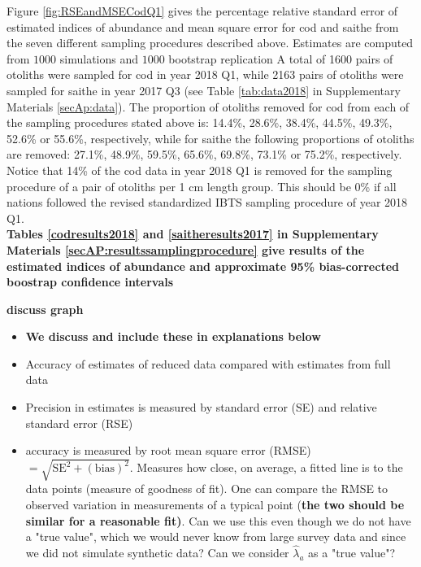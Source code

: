 \documentclass[a4paper 12pt]{article}
\numberwithin{equation}{section}
\begin{document}
{Figure \ref{fig:RSEandMSECodQ1} gives the percentage relative standard error of estimated indices of abundance and mean square error for cod and saithe from the seven different sampling procedures described above. Estimates are computed from $1000$ simulations and $1000$ bootstrap replication A total of 1600 pairs of otoliths were sampled for cod in year 2018 Q1, while 2163 pairs of otoliths were sampled for saithe in year 2017 Q3 (see Table \ref{tab:data2018} in Supplementary Materials \ref{secAp:data}). The proportion of otoliths removed for cod from each of the sampling  procedures stated above is: 14.4\%, 28.6\%, 38.4\%, 44.5\%, 49.3\%, 52.6\% or 55.6\%, respectively, while for saithe the following proportions of otoliths are removed: 27.1\%, 48.9\%, 59.5\%, 65.6\%, 69.8\%, 73.1\% or 75.2\%, respectively. Notice that 14\% of the cod data in year 2018 Q1 is removed for the sampling procedure of a pair of otoliths per 1 cm length group. This should be 0\% if all nations followed the revised standardized IBTS sampling procedure of year 2018 Q1. \\

{\bf Tables \ref{codresults2018} and \ref{saitheresults2017} in Supplementary Materials \ref{secAP:resultssamplingprocedure}  give results of the estimated indices of abundance and approximate 95\% bias-corrected boostrap confidence intervals }

{\bf discuss graph}\\

\begin{itemize}
\item {\bf We discuss and include these in explanations below}
\item Accuracy of estimates of reduced data compared with estimates from full data
\item Precision in estimates is measured by standard error (SE) and relative standard error (RSE)
\item accuracy is measured by root mean square error (RMSE) $= \sqrt{\mathrm{SE}^2 + (\mathrm{bias})^2}$. Measures how close, on average, a fitted line is to the data points (measure of goodness of fit). One can compare the RMSE to observed variation in measurements of a typical point {(\bf the two should be similar for a reasonable fit)}. Can we use this even though we do not have a "true value", which we would never know from large survey data and since we did not simulate synthetic data? Can we consider $\hat{\lambda}_{a}$ as a "true value"?
\end{itemize}

}
\end{document}
